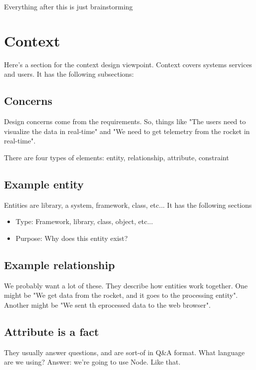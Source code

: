 \documentclass[10pt,draftclsnofoot,onecolumn]{IEEEtran}
\begin{document}
	
	
	
	
	\vspace{1in}
	{\Huge Everything after this is just brainstorming}
	
	
	
	\section{Context}

	Here's a section for the context design viewpoint.
	Context covers systems services and users.
	It has the following subsections:

	\subsection{Concerns}
	Design concerns come from the requirements. So, things like "The users need to visualize the data in real-time"
	and "We need to get telemetry from the rocket in real-time".

	There are four types of elements: entity, relationship, attribute, constraint

	\subsection{Example entity}
	Entities are library, a system, framework, class, etc... It has the following sections
	\begin{itemize}
		\item Type: Framework, library, class, object, etc...
		\item Purpose: Why does this entity exist?
	\end{itemize}



	\subsection{Example relationship}
	We probably want a lot of these.
	They describe how entities work together.
	One might be "We get data from the rocket, and it goes to the processing entity".
	Another might be "We sent th eprocessed data to the web browser".


	\subsection{Attribute is a fact}
	They usually answer questions, and are sort-of in Q\&A format.
	What language are we using? Answer: we're going to use Node. Like that.
\end{document}
